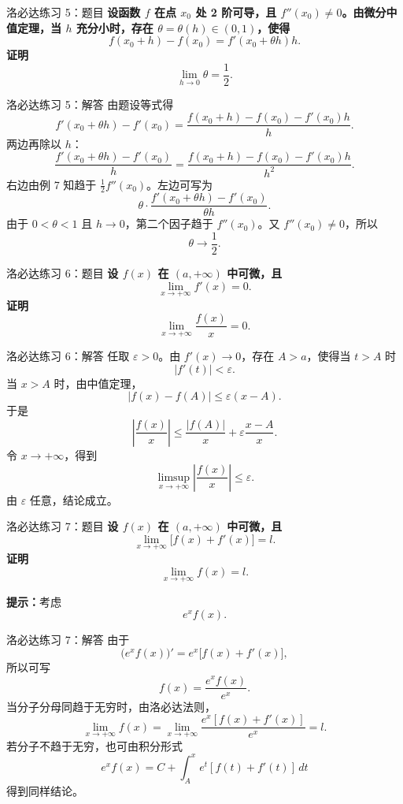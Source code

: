 \documentclass[aspectratio=169,11pt]{ctexbeamer}
\begin{document}
\begin{frame}{洛必达练习 5：题目}
\small
\textbf{设函数 $f$ 在点 $x_0$ 处 2 阶可导，且 $f''(x_0)\ne0$。由微分中值定理，当 $h$ 充分小时，存在 $\theta=\theta(h)\in(0,1)$，使得}
\[
  f(x_0+h)-f(x_0)=f'(x_0+\theta h)h.
\]
\textbf{证明}
\[
  \lim_{h\to0}\theta=\frac12.
\]
\end{frame}

\begin{frame}{洛必达练习 5：解答}
\small
由题设等式得
\[
  f'(x_0+\theta h)-f'(x_0)
  =
  \frac{f(x_0+h)-f(x_0)-f'(x_0)h}{h}.
\]
两边再除以 $h$：
\[
  \frac{f'(x_0+\theta h)-f'(x_0)}{h}
  =
  \frac{f(x_0+h)-f(x_0)-f'(x_0)h}{h^2}.
\]
右边由例 7 知趋于 $\frac12 f''(x_0)$。左边可写为
\[
  \theta\cdot
  \frac{f'(x_0+\theta h)-f'(x_0)}{\theta h}.
\]
由于 $0<\theta<1$ 且 $h\to0$，第二个因子趋于 $f''(x_0)$。又 $f''(x_0)\ne0$，所以
\[
  \theta\to\frac12.
\]
\end{frame}

\begin{frame}{洛必达练习 6：题目}
\small
\textbf{设 $f(x)$ 在 $(a,+\infty)$ 中可微，且}
\[
  \lim_{x\to+\infty}f'(x)=0.
\]
\textbf{证明}
\[
  \lim_{x\to+\infty}\frac{f(x)}{x}=0.
\]
\end{frame}

\begin{frame}{洛必达练习 6：解答}
\small
任取 $\varepsilon>0$。由 $f'(x)\to0$，存在 $A>a$，使得当 $t>A$ 时
\[
  |f'(t)|<\varepsilon.
\]
当 $x>A$ 时，由中值定理，
\[
  |f(x)-f(A)|\le \varepsilon(x-A).
\]
于是
\[
  \left|\frac{f(x)}{x}\right|
  \le
  \frac{|f(A)|}{x}+\varepsilon\frac{x-A}{x}.
\]
令 $x\to+\infty$，得到
\[
  \limsup_{x\to+\infty}\left|\frac{f(x)}{x}\right|\le\varepsilon.
\]
由 $\varepsilon$ 任意，结论成立。
\end{frame}

\begin{frame}{洛必达练习 7：题目}
\small
\textbf{设 $f(x)$ 在 $(a,+\infty)$ 中可微，且}
\[
  \lim_{x\to+\infty}\bigl[f(x)+f'(x)\bigr]=l.
\]
\textbf{证明}
\[
  \lim_{x\to+\infty}f(x)=l.
\]

\vspace{0.8em}
\textbf{提示：}考虑
\[
  e^x f(x).
\]
\end{frame}

\begin{frame}{洛必达练习 7：解答}
\small
由于
\[
  \bigl(e^x f(x)\bigr)'=e^x\bigl[f(x)+f'(x)\bigr],
\]
所以可写
\[
  f(x)=\frac{e^x f(x)}{e^x}.
\]
当分子分母同趋于无穷时，由洛必达法则，
\[
  \lim_{x\to+\infty}f(x)
  =
  \lim_{x\to+\infty}
  \frac{e^x[f(x)+f'(x)]}{e^x}
  =
  l.
\]
若分子不趋于无穷，也可由积分形式
\[
  e^x f(x)=C+\int_A^x e^t[f(t)+f'(t)]\,dt
\]
得到同样结论。
\end{frame}
\end{document}

